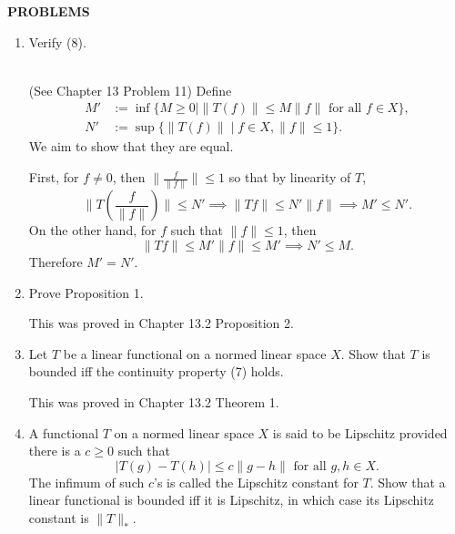 \begin{center}
	\textbf{PROBLEMS}
\end{center}
\begin{enumerate}
	\setcounter{enumi}{0}
    \item Verify (8).
    
    \ \\(See Chapter 13 Problem 11) 
    Define 
    \[
        \begin{split}
        M'&:=\inf\{M\ge0\mid\|T(f)\|\le M\|f\|\text{ for all }f\in X\},\\
        N'&:=\sup\{\|T(f)\|\mid f\in X, \|f\|\le1\}.
        \end{split}
    \]
    We aim to show that they are equal.
    
    First, for $f\neq0$, then $\|\frac{f}{\|f\|}\|\le1$ so that by linearity of $T$,
    \[\|T(\frac{f}{\|f\|})\|\le N'\implies\|Tf\|\le N'\|f\|\implies M'\le N'.\]
    On the other hand, for $f$ such that $\|f\|\le1$, then
    \[\|Tf\|\le M'\|f\|\le M'\implies N'\le M.\]
    Therefore $M'=N'$.
    \\\item Prove Proposition 1.

    This was proved in Chapter 13.2 Proposition 2.
    \item Let $T$ be a linear functional on a normed linear space $X$. Show that $T$ is bounded iff the continuity property (7) holds.
    
    This was proved in Chapter 13.2 Theorem 1.
    \item A functional $T$ on a normed linear space $X$ is said to be Lipschitz provided there is a $c\ge0$ such that
    \[
        |T(g)-T(h)|\le c\|g-h\|\text{ for all }g,h\in X.  
    \]
    The infimum of such $c$'s is called the Lipschitz constant for $T$. Show that a linear functional is bounded iff it is Lipschitz, in which case its Lipschitz constant is $\|T\|_*$.
    

\end{enumerate}
